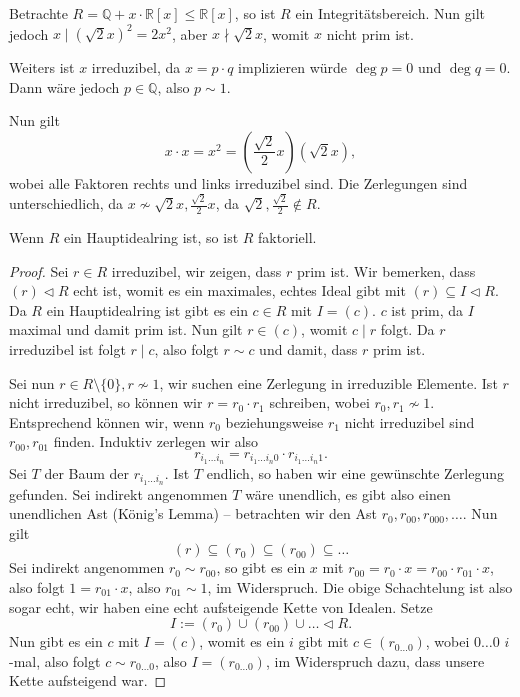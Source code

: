 \begin{example}
    Betrachte $R = \mathbb{Q} + x \cdot \mathbb{R}[x] \leq \mathbb{R}[x]$, so ist $R$ ein Integritätsbereich. Nun gilt jedoch $x \mid (\sqrt{2} x)^2 = 2x^2$, aber $x \nmid \sqrt{2}x$, womit $x$ nicht prim ist.
    
    Weiters ist $x$ irreduzibel, da $x = p \cdot q$ implizieren würde $\deg{p} = 0$ und $\deg{q} = 0$. Dann wäre jedoch $p \in \mathbb{Q}$, also $p \sim 1$.
    
    Nun gilt
    $$ x \cdot x = x^2 = \left(\frac{\sqrt{2}}{2} x\right)(\sqrt{2}x), $$
    wobei alle Faktoren rechts und links irreduzibel sind. Die Zerlegungen sind unterschiedlich, da $x \not\sim \sqrt{2} x, \frac{\sqrt{2}}{2} x$, da $\sqrt{2}, \frac{\sqrt{2}}{2} \notin R$.
\end{example}

\begin{proposition}
    Wenn $R$ ein Hauptidealring ist, so ist $R$ faktoriell.
\end{proposition}

\begin{proof}
    Sei $r \in R$ irreduzibel, wir zeigen, dass $r$ prim ist. Wir bemerken, dass $ (r) \vartriangleleft R $ echt ist, womit es ein maximales, echtes Ideal gibt mit $(r) \subseteq I \vartriangleleft R$. Da $R$ ein Hauptidealring ist gibt es ein $c \in R$ mit $I = (c)$. $c$ ist prim, da $I$ maximal und damit prim ist. Nun gilt $r \in (c)$, womit $c \mid r$ folgt. Da $r$ irreduzibel ist folgt $r \mid c$, also folgt $r \sim c$ und damit, dass $r$ prim ist.

    Sei nun $r \in R \setminus \{0\}, r \not\sim 1$, wir suchen eine Zerlegung in irreduzible Elemente. Ist $r$ nicht irreduzibel, so können wir $r = r_0 \cdot r_1$ schreiben, wobei $r_0, r_1 \not\sim 1$. Entsprechend können wir, wenn $r_0$ beziehungsweise $r_1$ nicht irreduzibel sind $r_{00}, r_{01}$ finden. Induktiv zerlegen wir also
    $$ r_{i_1 \hdots i_n} = r_{i_1 \hdots i_n 0} \cdot r_{i_1 \hdots i_n 1}. $$
    Sei $T$ der Baum der $r_{i_1 \hdots i_n}$. Ist $T$ endlich, so haben wir eine gewünschte Zerlegung gefunden. Sei indirekt angenommen $T$ wäre unendlich, es gibt also einen unendlichen Ast (König's Lemma) -- \obda betrachten wir den Ast $r_0, r_{00}, r_{000}, \hdots$. Nun gilt
    $$ (r) \subseteq (r_0) \subseteq (r_{00}) \subseteq \hdots $$
    Sei indirekt angenommen $r_0 \sim r_{00}$, so gibt es ein $x$ mit $r_{00} = r_0 \cdot x = r_{00} \cdot r_{01} \cdot x$, also folgt $ 1 = r_{01} \cdot x$, also $r_{01} \sim 1$, im Widerspruch. Die obige Schachtelung ist also sogar echt, wir haben eine echt aufsteigende Kette von Idealen. Setze
    $$ I := (r_0) \cup (r_{00}) \cup \hdots \vartriangleleft R. $$
    Nun gibt es ein $c$ mit $I = (c)$, womit es ein $i$ gibt mit $c \in (r_{0 \hdots 0})$, wobei $0 \hdots 0$ $i$-mal, also folgt $c \sim r_{0 \hdots 0}$, also $I = (r_{0 \hdots 0})$, im Widerspruch dazu, dass unsere Kette aufsteigend war.
\end{proof}

